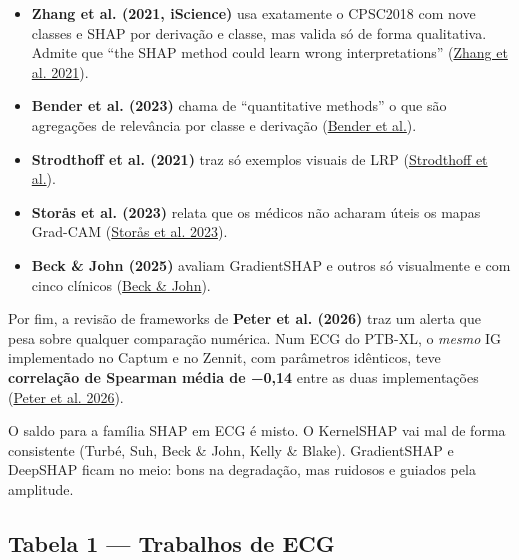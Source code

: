 \documentclass[11pt,a4paper]{article}
\begin{document}
\begin{itemize}
\item \textbf{Zhang et al. (2021, iScience)} usa exatamente o CPSC2018 com nove classes e SHAP por derivação e classe, mas valida só de forma qualitativa. Admite que ``the SHAP method could learn wrong interpretations'' (\href{https://pmc.ncbi.nlm.nih.gov/articles/PMC8082080}{Zhang et al. 2021}).
\item \textbf{Bender et al. (2023)} chama de ``quantitative methods'' o que são agregações de relevância por classe e derivação (\href{https://arxiv.org/pdf/2211.01738}{Bender et al.}).
\item \textbf{Strodthoff et al. (2021)} traz só exemplos visuais de LRP (\href{https://arxiv.org/pdf/2004.13701}{Strodthoff et al.}).
\item \textbf{Storås et al. (2023)} relata que os médicos não acharam úteis os mapas Grad-CAM (\href{https://pmc.ncbi.nlm.nih.gov/articles/PMC10378376/}{Storås et al. 2023}).
\item \textbf{Beck \& John (2025)} avaliam GradientSHAP e outros só visualmente e com cinco clínicos (\href{https://arxiv.org/html/2508.17294v1}{Beck \& John}).
\end{itemize}

Por fim, a revisão de frameworks de \textbf{Peter et al. (2026)} traz um alerta que pesa sobre qualquer comparação numérica. Num ECG do PTB-XL, o \textit{mesmo} IG implementado no Captum e no Zennit, com parâmetros idênticos, teve \textbf{correlação de Spearman média de −0,14} entre as duas implementações (\href{https://arxiv.org/abs/2608.21449}{Peter et al. 2026}).

O saldo para a família SHAP em ECG é misto. O KernelSHAP vai mal de forma consistente (Turbé, Suh, Beck \& John, Kelly \& Blake). GradientSHAP e DeepSHAP ficam no meio: bons na degradação, mas ruidosos e guiados pela amplitude.

\subsection{Tabela 1 — Trabalhos de ECG}
\end{document}
